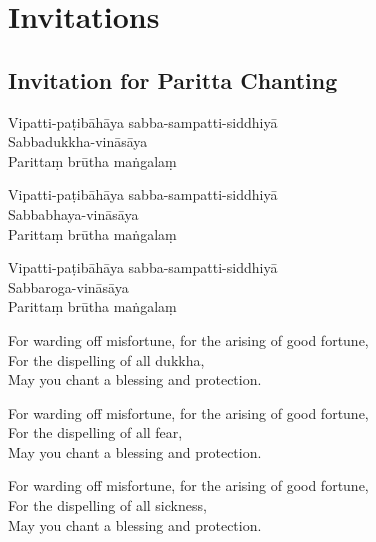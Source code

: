 \section{Invitations}

\subsection{Invitation for Paritta Chanting}
\label{paritta-invitation-for-chanting}


\vspace*{5pt}

\enlargethispage{\baselineskip}

\begin{paritta}


Vipatti-paṭibāhāya sabba-sampatti-siddhiyā\\
Sabbadukkha-vināsāya\\
Parittaṃ brūtha maṅgalaṃ

Vipatti-paṭibāhāya sabba-sampatti-siddhiyā\\
Sabbabhaya-vināsāya\\
Parittaṃ brūtha maṅgalaṃ

Vipatti-paṭibāhāya sabba-sampatti-siddhiyā\\
Sabbaroga-vināsāya\\
Parittaṃ brūtha maṅgalaṃ

\end{paritta}

\begin{english}
  For warding off misfortune, for the arising of good fortune,\\
  For the dispelling of all dukkha,\\
  May you chant a blessing and protection.

  For warding off misfortune, for the arising of good fortune,\\
  For the dispelling of all fear,\\
  May you chant a blessing and protection.

  For warding off misfortune, for the arising of good fortune,\\
  For the dispelling of all sickness,\\
  May you chant a blessing and protection.
\end{english}

